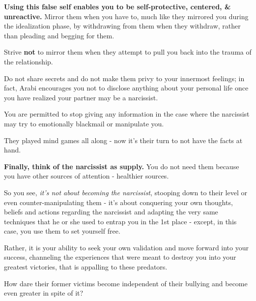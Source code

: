 \documentclass[oneside]{book}
\numberwithin{equation}{section}
\begin{document}
%
\textbf{Using this false self enables you to be self-protective, centered, \& unreactive.} Mirror them when you have to, much like they mirrored you during the idealization phase, by withdrawing from them when they withdraw, rather than pleading and begging for them.

Strive \textbf{not} to mirror them when they attempt to pull you back into the trauma of the relationship.

Do not share secrets and do not make them privy to your innermost feelings; in fact, Arabi encourages you not to disclose anything about your personal life once you have realized your partner may be a narcissist.

You are permitted to stop giving any information in the case where the narcissist may try to emotionally blackmail or manipulate you.

They played mind games all along - now it's their turn to not have the facts at hand.

%
\textbf{Finally, think of the narcissist as supply.} You do not need them because you have other sources of attention - healthier sources.




%
So you see, \textit{it's not about becoming the narcissist}, stooping down to their level or even counter-manipulating them - it's about conquering your own thoughts, beliefs and actions regarding the narcissist and adapting the very same techniques that he or she used to entrap you in the 1st place - except, in this case, you use them to set yourself free.

%


Rather, it is your ability to seek your own validation and move forward into your success, channeling the experiences that were meant to destroy you into your greatest victories, that is appalling to these predators.

How dare their former victims become independent of their bullying and become even greater in spite of it?
\end{document}
